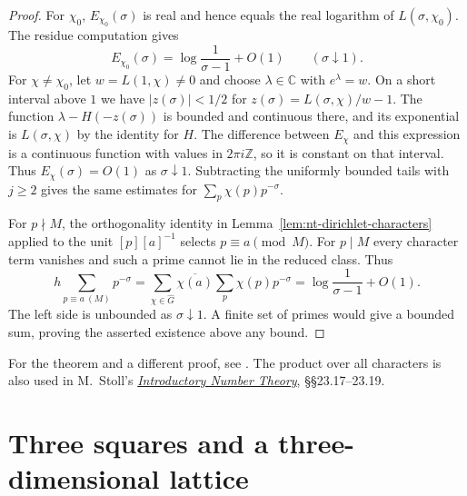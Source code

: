 \documentclass[11pt,oneside,openany]{book}
\theoremstyle{plain}
\theoremstyle{definition}
\theoremstyle{remark}
\begin{document}
\begin{proof}
For \(\chi_0\), \(E_{\chi_0}(\sigma)\) is real and hence equals
the real logarithm of \(L(\sigma,\chi_0)\).
The residue computation gives
\[
 E_{\chi_0}(\sigma)=\log\frac1{\sigma-1}+O(1)
 \qquad (\sigma\downarrow1).
\]
For \(\chi\ne\chi_0\), let \(w=L(1,\chi)\ne0\) and choose
\(\lambda\in\mathbb C\) with \(e^\lambda=w\).
On a short interval above \(1\) we have
\(|z(\sigma)|<1/2\) for \(z(\sigma)=L(\sigma,\chi)/w-1\).
The function \(\lambda-H(-z(\sigma))\) is bounded and continuous
there, and its exponential is \(L(\sigma,\chi)\) by the identity
for \(H\). The difference between \(E_\chi\) and
this expression is a continuous function with values in
\(2\pi i\mathbb Z\), so it is constant on that interval.
Thus \(E_\chi(\sigma)=O(1)\) as \(\sigma\downarrow1\).
Subtracting the uniformly bounded tails with \(j\ge2\)
gives the same estimates for \(\sum_p\chi(p)p^{-\sigma}\).

For \(p\nmid M\), the orthogonality identity in
Lemma~\ref{lem:nt-dirichlet-characters} applied to the unit
\([p][a]^{-1}\) selects \(p\equiv a\pmod M\).
For \(p\mid M\) every character term vanishes and such a
prime cannot lie in the reduced class. Thus
\[
 h\sum_{p\equiv a\ (M)}p^{-\sigma}
   =\sum_{\chi\in\widehat G}\overline{\chi(a)}
              \sum_p\chi(p)p^{-\sigma}
   =\log\frac1{\sigma-1}+O(1).
\]
The left side is unbounded as \(\sigma\downarrow1\).
A finite set of primes would give a bounded sum, proving the
asserted existence above any bound.
\end{proof}

For the theorem and a different proof, see \cite[Chapter 7]{apostol}.
The product over all characters is also used in
M.~Stoll's \href{https://mathe2.uni-bayreuth.de/stoll/lecture-notes/IntroductoryNumberTheory.pdf}
{\emph{Introductory Number Theory}}, \S\S23.17--23.19.

\section{Three squares and a three-dimensional lattice}
\end{document}
